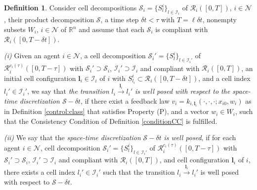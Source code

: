 \documentclass[reqno]{amsart}
\theoremstyle{plain}
\theoremstyle{definition}
\newtheorem{dfn}[thm]{Definition}
\numberwithin{equation}{section}
\begin{document}
\begin{dfn}\label{well:posed:discretization}
Consider cell decompositions ${\ensuremath{\mathcal{S}}}_i=\{S_l^i\}_{l\in{\ensuremath{\mathcal{I}}}_i}$ of ${\ensuremath{\mathcal{R}}}_i([0,T])$, $i\in{\ensuremath{\mathcal{N}}}$, their product decomposition ${\ensuremath{\mathcal{S}}}$, a time step $\delta t<\tau$ with $T=\ell\delta t$, nonempty subsets $W_i$, $i\in{\ensuremath{\mathcal{N}}}$ of ${\ensuremath{\mathbb{R}^{{n}}}}$ and assume that each ${\ensuremath{\mathcal{S}}}_i$ is compliant with  ${\ensuremath{\mathcal{R}}}_i([0,T-\delta t])$.

\noindent \textit{(i)} Given an agent $i\in{\ensuremath{\mathcal{N}}}$, a cell decomposition ${\ensuremath{\mathcal{S}}}_i'=\{S_l^i\}_{l\in{\ensuremath{\mathcal{I}}}_i'}$ of ${\ensuremath{\mathcal{R}}}_i^{c_i(\tau)}([0,T-\tau])$ with ${\ensuremath{\mathcal{S}}}_i'\supset{\ensuremath{\mathcal{S}}}_i$,  ${\ensuremath{\mathcal{I}}}_i'\supset{\ensuremath{\mathcal{I}}}_i$ and compliant with ${\ensuremath{\mathcal{R}}}_i([0,T])$, an initial cell configuration ${\textbf{{l}}}_i\in{\ensuremath{\boldsymbol{\mathcal{I}}}}_i$ of $i$ with $S_{l_i}^i\subset{\ensuremath{\mathcal{R}}}_i([0,T-\delta t])$, and a cell index $l_i'\in{\ensuremath{\mathcal{I}}}_i'$, we say that \textit{the transition} $l_i\overset{{\textbf{{l}}}_i}{\longrightarrow}l_i'$ \textit{is well posed with respect to the space-time discretization ${\ensuremath{\mathcal{S}}}-\delta t$}, if there exist a feedback law  $v_i=k_{i,{\textbf{{l}}}_i}(\cdot,\cdot,\cdot;x_{i0},w_i)$ as in Definition \ref{control:class} that satisfies Property (P), and a vector $w_i\in W_i$, such that the Consistency Condition of Definition \ref{conditionCC} is fulfilled.

\noindent \textit{(ii)} We say that the \textit{space-time discretization} ${\ensuremath{\mathcal{S}}}-\delta t$ \textit{is well posed}, if for each agent $i\in{\ensuremath{\mathcal{N}}}$, cell decomposition ${\ensuremath{\mathcal{S}}}_i'=\{S_l^i\}_{l\in{\ensuremath{\mathcal{I}}}_i'}$ of ${\ensuremath{\mathcal{R}}}_i^{c_i(\tau)}([0,T-\tau])$ with ${\ensuremath{\mathcal{S}}}_i'\supset{\ensuremath{\mathcal{S}}}_i$,  ${\ensuremath{\mathcal{I}}}_i'\supset{\ensuremath{\mathcal{I}}}_i$ and compliant with ${\ensuremath{\mathcal{R}}}_i([0,T])$, and cell configuration ${\textbf{{l}}}_i$ of $i$, there exists a cell index $l_i'\in{\ensuremath{\mathcal{I}}}_i'$ such that the transition $l_i\overset{{\textbf{{l}}}_i}{\longrightarrow}l_i'$ is well posed with respect to ${\ensuremath{\mathcal{S}}}-\delta t$.
\end{dfn}
\end{document}
